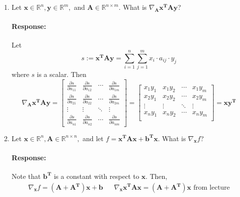 \documentclass [11pt] {article}
\newcommand{\R}{\mathbb{R}}
\newcommand{\T}{\bf{T}}
\newcommand{\A}{\bf{A}}
\newcommand{\AT}{\bf{A$^{\T}$}}
\newcommand{\x}{\bf{x}}
\newcommand{\y}{\bf{y}}
\newenvironment{response}{\begin{responseframe}\vspace{-10pt}\paragraph{Response:}}{\end{responseframe}}
\renewcommand{\bf}[1]{\textbf{{#1}}}
\begin{document}
\begin{enumerate}
\begin{enumerate}[itemsep=10pt]
            \item Let $\x \in \R^n, \y \in \R^m,$ and $\A \in \R^{n \times m}$. 
                What is $\nabla_{\A} \x^{\T} \A \y$?
                \begin{response}
                    Let
                    \[s := \x^{\T} \A \y = \sum^{n}_{i = 1} \sum^{m}_{j = 1} x_i \cdot a_{ij} \cdot y_j\]
                    where $s$ is a scalar. Then
                    \[
                        \nabla_{\A} \x^{\T} \A \y = 
                        \begin{bmatrix}
                            \frac{\partial s}{\partial a_{11}} & \frac{\partial s}{\partial a_{12}} & \cdots & \frac{\partial s}{\partial a_{1m}} \\
                            \frac{\partial s}{\partial a_{21}} & \frac{\partial s}{\partial a_{22}} & \cdots & \frac{\partial s}{\partial a_{2m}} \\
                            \vdots & \vdots & \ddots & \vdots \\
                            \frac{\partial s}{\partial a_{n1}} & \frac{\partial s}{\partial a_{n2}} & \cdots & \frac{\partial s}{\partial a_{nm}}
                        \end{bmatrix} =
                        \begin{bmatrix}
                            x_1 y_1 & x_1 y_2 & \cdots & x_1 y_m \\
                            x_2 y_1 & x_2 y_2 & \cdots & x_2 y_m \\
                            \vdots & \vdots & \ddots & \vdots \\
                            x_n y_1 & x_n y_2 & \cdots & x_n y_m \\
                        \end{bmatrix}
                        = \x \y^{\T}
                    \]
                \end{response}

            \item Let $\x \in \R^n, \A \in \R^{n \times n},$ and let 
                $f = \x^{\T} \A \x + \bf{b}^{\T} \x$. What is $\nabla_{\x} f$?
                \begin{response}
                    Note that $\bf{b}^{\T}$ is a constant with respect to $\x$. Then,
                    \begin{align*}
                        \nabla_{\x} f = (\A + \AT) \x + \bf{b} && \nabla_{\x} \x^{\T} \A \x = (\A + \AT) \x \text{ from lecture}
                    \end{align*}
                \end{response}


\end{enumerate}
\end{enumerate}
\end{document}
